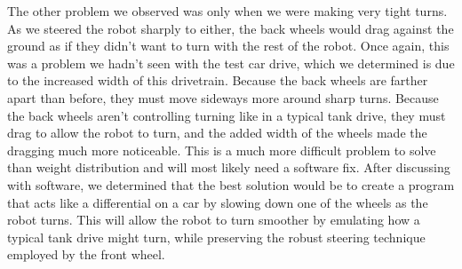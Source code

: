 The other problem we observed was only when we were making very tight turns. As we steered the robot sharply to either, the back wheels would drag against the ground as if they didn’t want to turn with the rest of the robot. Once again, this was a problem we hadn’t seen with the test car drive, which we determined is due to the increased width of this drivetrain. Because the back wheels are farther apart than before, they must move sideways more around sharp turns. Because the back wheels aren't controlling turning like in a typical tank drive, they must drag to allow the robot to turn, and the added width of the wheels made the dragging much more noticeable. This is a much more difficult problem to solve than weight distribution and will most likely need a software fix. After discussing with software, we determined that the best solution would be to create a program that acts like a differential on a car by slowing down one of the wheels as the robot turns. This will allow the robot to turn smoother by emulating how a typical tank drive might turn, while preserving the robust steering technique employed by the front wheel.



